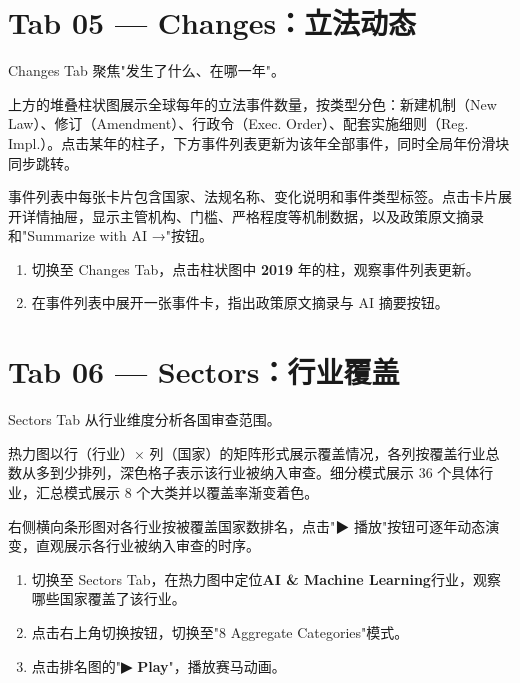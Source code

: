 \documentclass[12pt,a4paper]{article}
\begin{document}
\section{Tab 05 — Changes：立法动态}

Changes Tab 聚焦"发生了什么、在哪一年"。

上方的堆叠柱状图展示全球每年的立法事件数量，按类型分色：新建机制（New Law）、修订（Amendment）、行政令（Exec. Order）、配套实施细则（Reg. Impl.）。点击某年的柱子，下方事件列表更新为该年全部事件，同时全局年份滑块同步跳转。

事件列表中每张卡片包含国家、法规名称、变化说明和事件类型标签。点击卡片展开详情抽屉，显示主管机构、门槛、严格程度等机制数据，以及政策原文摘录和"Summarize with AI →"按钮。

\begin{demobox}
  \begin{enumerate}
    \item 切换至 Changes Tab，点击柱状图中 \textbf{2019} 年的柱，观察事件列表更新。
    \item 在事件列表中展开一张事件卡，指出政策原文摘录与 AI 摘要按钮。
  \end{enumerate}
\end{demobox}

\section{Tab 06 — Sectors：行业覆盖}

Sectors Tab 从行业维度分析各国审查范围。

热力图以行（行业）× 列（国家）的矩阵形式展示覆盖情况，各列按覆盖行业总数从多到少排列，深色格子表示该行业被纳入审查。细分模式展示 36 个具体行业，汇总模式展示 8 个大类并以覆盖率渐变着色。

右侧横向条形图对各行业按被覆盖国家数排名，点击"▶ 播放"按钮可逐年动态演变，直观展示各行业被纳入审查的时序。

\begin{demobox}
  \begin{enumerate}
    \item 切换至 Sectors Tab，在热力图中定位\textbf{AI \& Machine Learning}行业，观察哪些国家覆盖了该行业。
    \item 点击右上角切换按钮，切换至"8 Aggregate Categories"模式。
    \item 点击排名图的"\textbf{▶ Play}"，播放赛马动画。
  \end{enumerate}
\end{demobox}
\end{document}
